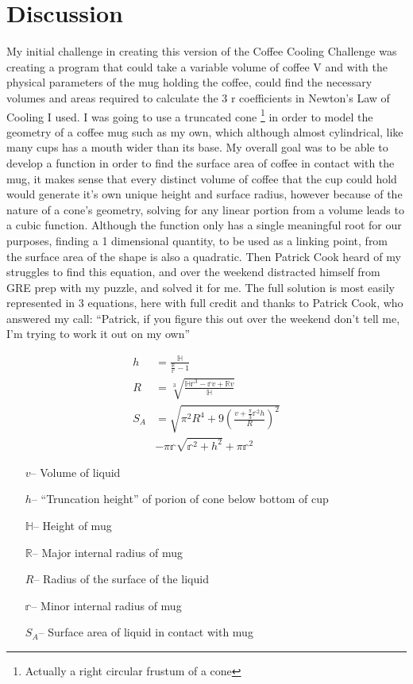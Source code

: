 \documentclass[12pt]{article}
\begin{document}
\section{Discussion}
My initial challenge in creating this version of the Coffee Cooling Challenge was creating a program that could take a variable volume of coffee V and with the physical parameters of the mug holding the coffee, could find the necessary volumes and areas required to calculate the 3 r coefficients in Newton's Law of Cooling I used. I was going to use a truncated cone
\footnote{Actually a right circular frustum of a cone}
in order to model the geometry of a coffee mug such as my own, which although almost cylindrical, like many cups has a mouth wider than its base. My overall goal was to be able to develop a function in order to find the surface area of coffee in contact with the mug, it makes sense that every distinct volume of coffee that the cup could hold would generate it's own unique height and surface radius, however because of the nature of a cone's geometry, solving for any linear portion from a volume leads to a cubic function. Although the function only has a single meaningful root for our purposes, finding a 1 dimensional quantity, to be used as a linking point, from the surface area of the shape is also a quadratic. Then Patrick Cook heard of my struggles to find this equation, and over the weekend distracted himself from GRE prep with my puzzle, and solved it for me. The full solution is most easily represented in 3 equations, here with full credit and thanks to Patrick Cook, who answered my call: ``Patrick, if you figure this out over the weekend don't tell me, I'm trying to work it out on my own''

\begin{equation}
\begin{aligned}
h &= \frac{\mathbb{H}}{\frac{\mathbb{R}}{\mathbb{r}} - 1} \\
R &= \sqrt[3]{\frac{\mathbb{H}\mathbb{r}^3 - \mathbb{r}v + \mathbb{R}v}{\mathbb{H}}} \\
S_A &= \sqrt{\pi ^2 R^4 + 9(\frac{v + \frac{\pi}{3} \mathbb{r}^2 h}{R})^2} \\
& - \pi \mathbb{r} \sqrt{\mathbb{r}^2 + h^2} + \pi \mathbb{r}^2
\end{aligned}
\end{equation}

\begin{enumerate}
\item[$v$--] Volume of liquid
\item[$h$--] ``Truncation height'' of porion of cone below bottom of cup
\item[$\mathbb{H}$--] Height of mug
\item[$\mathbb{R}$--] Major internal radius of mug
\item[$R$--] Radius of the surface of the liquid
\item[$\mathbb{r}$--] Minor internal radius of mug
\item[$S_A$--] Surface area of liquid in contact with mug
\end{enumerate}
\end{document}
